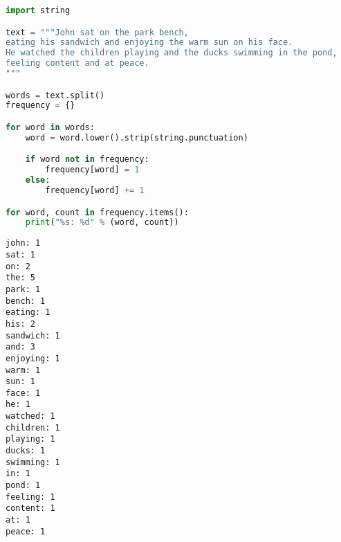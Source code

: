\vspace{0.5cm}


\begin{lstlisting}[language=Python]
import string

text = """John sat on the park bench,
eating his sandwich and enjoying the warm sun on his face.
He watched the children playing and the ducks swimming in the pond,
feeling content and at peace.
"""

words = text.split()
frequency = {}

for word in words:
	word = word.lower().strip(string.punctuation)

	if word not in frequency:
		frequency[word] = 1
	else:
		frequency[word] += 1

for word, count in frequency.items():
	print("%s: %d" % (word, count))
\end{lstlisting}

\begin{tcolorbox}
	\begin{verbatim}
john: 1
sat: 1
on: 2
the: 5
park: 1
bench: 1
eating: 1
his: 2
sandwich: 1
and: 3
enjoying: 1
warm: 1
sun: 1
face: 1
he: 1
watched: 1
children: 1
playing: 1
ducks: 1
swimming: 1
in: 1
pond: 1
feeling: 1
content: 1
at: 1
peace: 1
\end{verbatim}
\end{tcolorbox}

\newpage